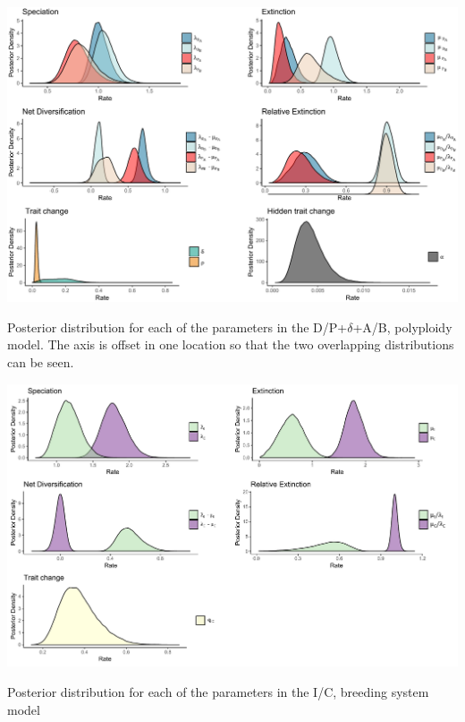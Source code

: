 \begin{suppfigure}
\includegraphics[width=\textwidth]{hisseDPposteriordist.pdf}
\caption{Posterior distribution for each of the parameters in the D/P+$\delta$+A/B, polyploidy model.  The axis is offset in one location so that the two overlapping distributions can be seen.} %
\label{suppfigure:DPAB}
\end{suppfigure}


\begin{suppfigure}
\includegraphics[width=\textwidth]{bisseSIposteriordist.pdf}
\caption{Posterior distribution for each of the parameters in the I/C, breeding system model} %
\label{suppfigure:IC}
\end{suppfigure}


